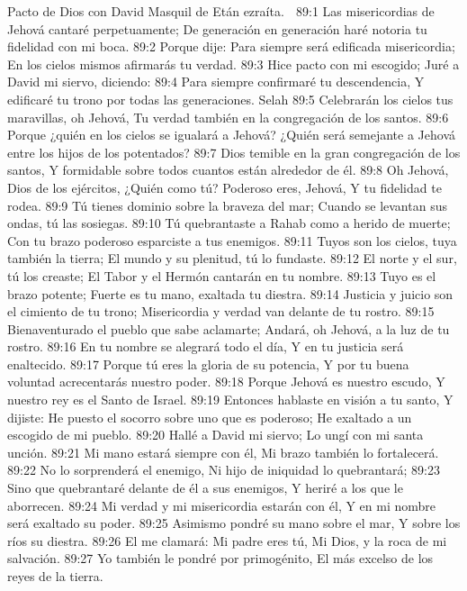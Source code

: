 Pacto de Dios con David 
Masquil de Etán ezraíta. 

89:1 Las misericordias de Jehová cantaré perpetuamente; 
De generación en generación haré notoria tu fidelidad con mi boca. 
89:2 Porque dije: Para siempre será edificada misericordia; 
En los cielos mismos afirmarás tu verdad. 
89:3 Hice pacto con mi escogido; 
Juré a David mi siervo, diciendo: 
89:4 Para siempre confirmaré tu descendencia, 
Y edificaré tu trono por todas las generaciones.  Selah 
89:5 Celebrarán los cielos tus maravillas, oh Jehová, 
Tu verdad también en la congregación de los santos. 
89:6 Porque ¿quién en los cielos se igualará a Jehová? 
¿Quién será semejante a Jehová entre los hijos de los potentados? 
89:7 Dios temible en la gran congregación de los santos, 
Y formidable sobre todos cuantos están alrededor de él. 
89:8 Oh Jehová, Dios de los ejércitos, 
¿Quién como tú? Poderoso eres, Jehová, 
Y tu fidelidad te rodea. 
89:9 Tú tienes dominio sobre la braveza del mar; 
Cuando se levantan sus ondas, tú las sosiegas. 
89:10 Tú quebrantaste a Rahab como a herido de muerte; 
Con tu brazo poderoso esparciste a tus enemigos. 
89:11 Tuyos son los cielos, tuya también la tierra; 
El mundo y su plenitud, tú lo fundaste. 
89:12 El norte y el sur, tú los creaste; 
El Tabor y el Hermón cantarán en tu nombre. 
89:13 Tuyo es el brazo potente; 
Fuerte es tu mano, exaltada tu diestra. 
89:14 Justicia y juicio son el cimiento de tu trono; 
Misericordia y verdad van delante de tu rostro. 
89:15 Bienaventurado el pueblo que sabe aclamarte; 
Andará, oh Jehová, a la luz de tu rostro. 
89:16 En tu nombre se alegrará todo el día, 
Y en tu justicia será enaltecido. 
89:17 Porque tú eres la gloria de su potencia, 
Y por tu buena voluntad acrecentarás nuestro poder. 
89:18 Porque Jehová es nuestro escudo, 
Y nuestro rey es el Santo de Israel. 
89:19 Entonces hablaste en visión a tu santo, 
Y dijiste: He puesto el socorro sobre uno que es poderoso; 
He exaltado a un escogido de mi pueblo. 
89:20 Hallé a David mi siervo; 
Lo ungí con mi santa unción. 
89:21 Mi mano estará siempre con él, 
Mi brazo también lo fortalecerá. 
89:22 No lo sorprenderá el enemigo, 
Ni hijo de iniquidad lo quebrantará; 
89:23 Sino que quebrantaré delante de él a sus enemigos, 
Y heriré a los que le aborrecen. 
89:24 Mi verdad y mi misericordia estarán con él, 
Y en mi nombre será exaltado su poder. 
89:25 Asimismo pondré su mano sobre el mar, 
Y sobre los ríos su diestra. 
89:26 El me clamará: Mi padre eres tú, 
Mi Dios, y la roca de mi salvación. 
89:27 Yo también le pondré por primogénito, 
El más excelso de los reyes de la tierra. 
